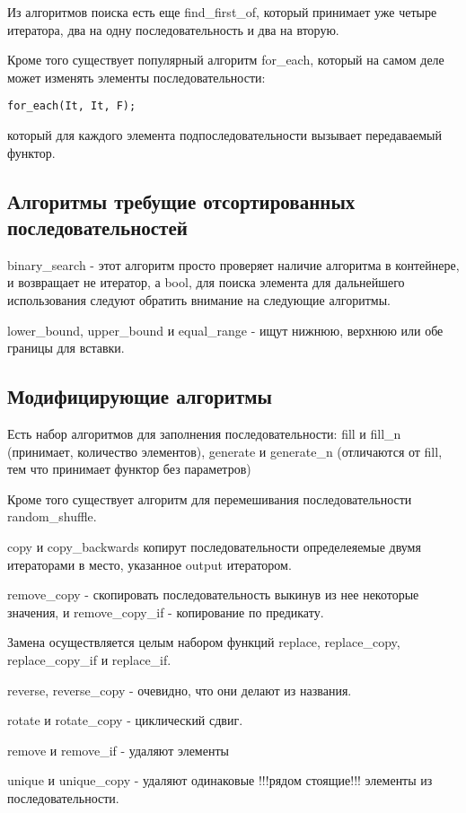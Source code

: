 Из алгоритмов поиска есть еще find\_first_of, который принимает уже четыре итератора, два на одну последовательность и два на вторую.

Кроме того существует популярный алгоритм for\_each, который на самом деле может изменять элементы последовательности:
\begin{lstlisting}
for_each(It, It, F);
\end{lstlisting}
который для каждого элемента подпоследовательности вызывает передаваемый функтор.

\subsection{Алгоритмы требущие отсортированных последовательностей}

binary\_search - этот алгоритм просто проверяет наличие алгоритма в контейнере, и возвращает не итератор, а bool, для поиска элемента для дальнейшего
использования следуют обратить внимание на следующие алгоритмы.

lower\_bound, upper\_bound и equal\_range - ищут нижнюю, верхнюю или обе границы для вставки.

\subsection{Модифицирующие алгоритмы}

Есть набор алгоритмов для заполнения последовательности: fill и fill\_n (принимает, количество элементов), generate и generate\_n (отличаются от fill, тем что
принимает функтор без параметров)

Кроме того существует алгоритм для перемешивания последовательности random\_shuffle.

copy и copy\_backwards копирут последовательности определеяемые двумя итераторами в место, указанное output итератором.

remove\_copy - скопировать последовательность выкинув из нее некоторые значения, и remove\_copy\_if - копирование по предикату.

Замена осуществляется целым набором функций replace, replace\_copy, replace\_copy\_if и replace\_if.

reverse, reverse\_copy - очевидно, что они делают из названия.

rotate и rotate\_copy - циклический сдвиг.

remove и remove\_if - удаляют элементы

unique и unique\_copy - удаляют одинаковые !!!рядом стоящие!!! элементы из последовательности.

